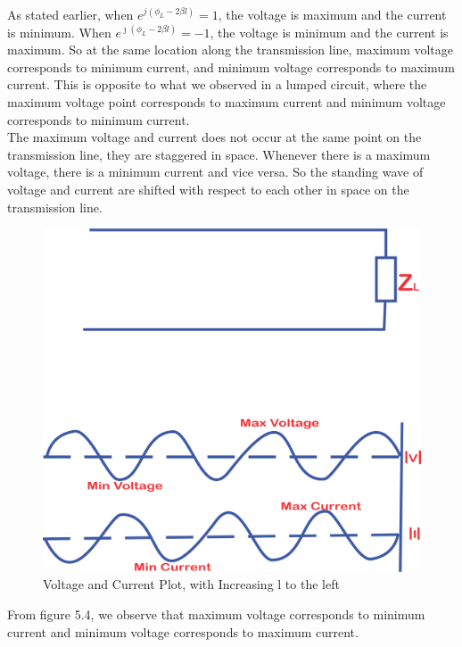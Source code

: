  As stated earlier, when $ e^{j(\phi_L - 2 \beta l)} = 1$, the voltage is maximum and the current is minimum. When $ e^{\jmath(\phi_L - 2 \beta l)} = -1$, the voltage is minimum and the current is maximum. So at the same location along the transmission line, maximum voltage corresponds to minimum current, and minimum voltage corresponds to maximum current. This is opposite to what we observed in a lumped circuit, where the maximum voltage point corresponds to maximum current and minimum voltage corresponds to minimum current.\\
The maximum voltage and current does not occur at the same point on the transmission line, they are staggered in space. Whenever there is a maximum voltage, there is a minimum current and vice versa. So the standing wave of voltage and current are shifted with respect to each other in space on the transmission line. 
\begin{figure}[h]
\centering
\includegraphics[width=0.6\linewidth]{./graphics/asdfghjhgfdsa}
\caption{Voltage and Current Plot, with Increasing l to the left}
\label{fig:asdfghjhgfdsa}
\end{figure}
From figure 5.4, we observe that maximum voltage corresponds to minimum current and minimum voltage corresponds to maximum current.

